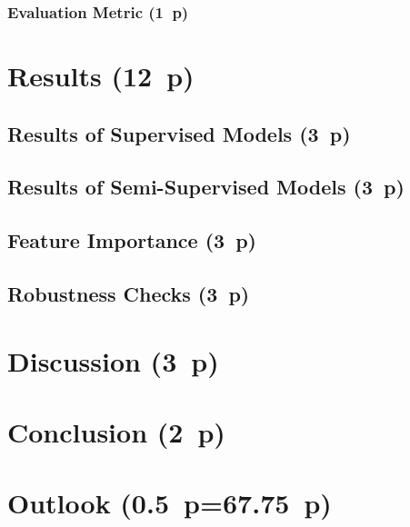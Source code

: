 \subsubsection{Evaluation Metric (1~p)}\label{evaluation-metric}

\newpage
\section{Results (12~p)}\label{results}

\subsection{Results of Supervised
  Models (3~p)}\label{results-of-supervised-models}

\subsection{Results of Semi-Supervised
  Models (3~p)}\label{results-of-semi-supervised-models}

\subsection{Feature Importance (3~p)}\label{feature-importance}

\subsection{Robustness Checks (3~p)}\label{robustness-checks}

\newpage
\section{Discussion (3~p)}\label{discussion}

\newpage
\section{Conclusion (2~p)}\label{conclusion}

\newpage
\section{Outlook (0.5~p=67.75~p)}\label{outlook}

